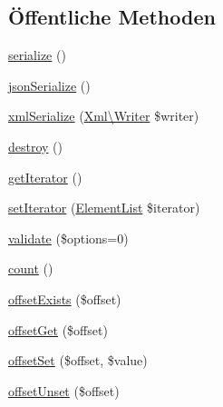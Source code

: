 \subsection*{Öffentliche Methoden}
\begin{DoxyCompactItemize}
\item 
\mbox{\hyperlink{class_sabre_1_1_v_object_1_1_node_a9c551f52d7470f8fc107d652467858fb}{serialize}} ()
\item 
\mbox{\hyperlink{class_sabre_1_1_v_object_1_1_node_a0194e7b8933a2cf2ee10b353a73cd4f8}{json\+Serialize}} ()
\item 
\mbox{\hyperlink{class_sabre_1_1_v_object_1_1_node_ab885518663b677a0eb10aae51256786e}{xml\+Serialize}} (\mbox{\hyperlink{class_sabre_1_1_xml_1_1_writer}{Xml\textbackslash{}\+Writer}} \$writer)
\item 
\mbox{\hyperlink{class_sabre_1_1_v_object_1_1_node_aaac8c0b2c33c27800ead3c9dbfdb0808}{destroy}} ()
\item 
\mbox{\hyperlink{class_sabre_1_1_v_object_1_1_node_a195a12fb85cc11562f8081b3810e3a17}{get\+Iterator}} ()
\item 
\mbox{\hyperlink{class_sabre_1_1_v_object_1_1_node_a6b84ade1d72b4a99dd940d658edb4105}{set\+Iterator}} (\mbox{\hyperlink{class_sabre_1_1_v_object_1_1_element_list}{Element\+List}} \$iterator)
\item 
\mbox{\hyperlink{class_sabre_1_1_v_object_1_1_node_af9c38fcb5a0bc73f4d4fe39663a4abdd}{validate}} (\$options=0)
\item 
\mbox{\hyperlink{class_sabre_1_1_v_object_1_1_node_a312c695bb3c2bacffd77d04c210e50ca}{count}} ()
\item 
\mbox{\hyperlink{class_sabre_1_1_v_object_1_1_node_aaf1b8e12e5bb867694018646b3324b68}{offset\+Exists}} (\$offset)
\item 
\mbox{\hyperlink{class_sabre_1_1_v_object_1_1_node_aef9b671ed3550954fa5db043fca78c8b}{offset\+Get}} (\$offset)
\item 
\mbox{\hyperlink{class_sabre_1_1_v_object_1_1_node_a8f4f80ae35d9f1165534158671869676}{offset\+Set}} (\$offset, \$value)
\item 
\mbox{\hyperlink{class_sabre_1_1_v_object_1_1_node_a71645ad99eea1601e93aaee70f584ebf}{offset\+Unset}} (\$offset)
\end{DoxyCompactItemize}
